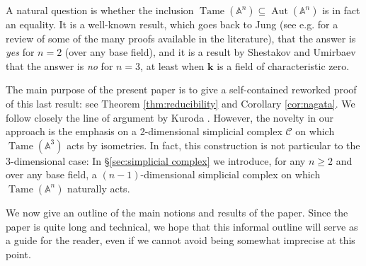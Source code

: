 \documentclass[reqno,oneside,11pt]{amsart}
\theoremstyle{plain}
\theoremstyle{definition}
\newcommand{\A}{{\mathbb{A}}}
\newcommand{\K}{\mathbf{k}}
\DeclareMathOperator{\Aut}{Aut}
\DeclareMathOperator{\Tame}{Tame}
\newcommand{\Comp}{\mathcal{C}}
\renewcommand{\ge}{\geqslant}
\begin{document}
A natural question is whether the inclusion $\Tame(\A^n) \subseteq \Aut(\A^n)$ is in fact an equality.
It is a well-known result, which goes back to Jung (see e.g. \cite{LJung} for a review of some of the many proofs available in the literature), that the answer is \textit{yes} for $n = 2$ (over any base field), and it is a result by Shestakov and Umirbaev \cite{SU:main} that the answer is \textit{no} for $n = 3$, at least when $\K$ is a field of characteristic zero.

The main purpose of the present paper is to give a self-contained reworked proof of this last result: see  Theorem \ref{thm:reducibility} and Corollary \ref{cor:nagata}.
We follow closely the line of argument by Kuroda \cite{Ku:main}.
However, the novelty in our approach is the emphasis on a 2-dimensional simplicial complex $\Comp$ on which $\Tame(\A^3)$ acts by isometries.
In fact, this construction is not particular to the 3-dimensional case: In
\S\ref{sec:simplicial complex} we introduce, for any $n \ge 2$ and over any base
field, a $(n-1)$-dimensional simplicial complex on which $\Tame(\A^n)$ naturally
acts.

We now give an outline of the main notions and results of the paper.
Since the paper is quite long and technical, we hope that this informal outline will serve as a guide for the reader, even if we cannot avoid being somewhat imprecise at this point.
\end{document}
